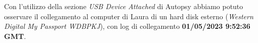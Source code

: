 Con l'utilizzo della sezione \textit{USB Device Attached} di Autopsy abbiamo potuto osservare il collegamento al computer di Laura di un hard disk esterno (\textit{Western Digital My Passport WDBPKJ}), con log di collegamento \textbf{01/05/2023 9:52:36 GMT}.